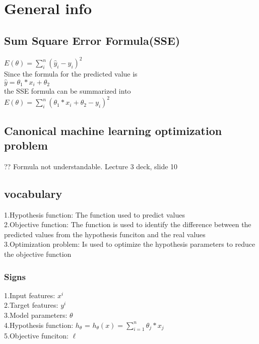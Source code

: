 \documentclass{article}
\begin{document}
\section{General info}
\subsection{Sum Square Error Formula(SSE)}
$E(\theta)= \sum_{i}^{n} (\hat{y}_i - y_i)^2$ \\
Since the formula for the predicted value is \\
$\hat{y} = \theta_1 * x_i + \theta_2$ \\ 
the SSE formula can be summarized into\\
$ E(\theta) = \sum_{i}^{n} (\theta_1 * x_i + \theta_2 - y_i) ^2$

\subsection{Canonical machine learning optimization problem}
?? Formula not understandable. Lecture 3 deck, slide 10

\subsection{vocabulary}
1.Hypothesis function: The function used to predict values \\
2.Objective function: The function is used to identify the difference between the predicted values from the hypothesis funciton and the real values \\
3.Optimization problem: Is used to optimize the hypothesis parameters to reduce the objective function
\subsubsection{Signs}
1.Input features: $x^i$ \\
2.Target features: $y^i$ \\
3.Model parameters: $\theta$ \\ 
4.Hypothesis function: $h_\theta$ = $h_\theta(x) = \sum_{i=1}^{n} \theta_j * x_j$ \\
5.Objective funciton: $\ell$
\end{document}
